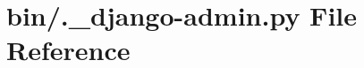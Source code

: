 \hypertarget{_8__django-admin_8py}{\section{bin/.\-\_\-django-\/admin.py File Reference}
\label{_8__django-admin_8py}
}
